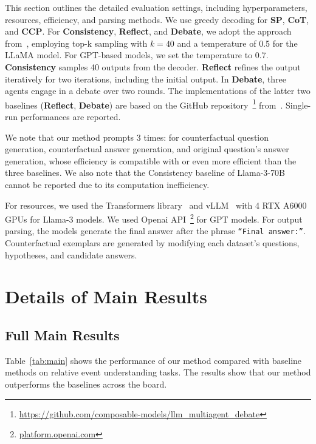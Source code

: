 This section outlines the detailed evaluation settings, including hyperparameters, resources, efficiency, and parsing methods.
We use greedy decoding for \textbf{SP}, \textbf{CoT}, and \textbf{CCP}. For \textbf{Consistency}, \textbf{Reflect}, and \textbf{Debate}, we adopt the approach from~\citet{wang2023self}, employing top-k sampling with 
$k=40$ and a temperature of 0.5 for the LLaMA model. For GPT-based models, we set the temperature to 0.7.
\textbf{Consistency} samples 40 outputs from the decoder. \textbf{Reflect} refines the output iteratively for two iterations, including the initial output. In \textbf{Debate}, three agents engage in a debate over two rounds\cite{du2024improving}.
The implementations of the latter two baselines (\textbf{Reflect}, \textbf{Debate}) are based on the GitHub repository~\footnote{\url{https://github.com/composable-models/llm_multiagent_debate}} from~\citet{du2024improving}. Single-run performances are reported.

We note that our method prompts 3 times: for counterfactual question generation, counterfactual answer generation, and original question's answer generation, whose efficiency is compatible with or even more efficient than the three baselines. We also note that the Consistency baseline of Llama-3-70B cannot be reported due to its computation inefficiency.


For resources, we used the Transformers library~\cite{wolf-etal-2020-transformers} and vLLM~\cite{kwon2023efficient} with 4 RTX A6000 GPUs for Llama-3 models. We used Openai API~\footnote{\url{platform.openai.com}} for GPT models.
For output parsing, the models generate the final answer after the phrase \texttt{``Final answer:''}. Counterfactual exemplars are generated by modifying each dataset's questions, hypotheses, and candidate answers.







\section{Details of Main Results}

\subsection{Full Main Results}
\label{appndx:full_main_result}
Table~\ref{tab:main} shows the performance of our method compared with baseline methods on relative event understanding tasks. The results show that our method outperforms the baselines across the board.




